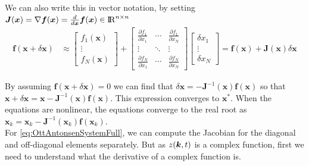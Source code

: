 We can also write this in vector notation, by setting $\boldsymbol{J}(\boldsymbol{x}) = \nabla \boldsymbol{f}(\boldsymbol{x}) = \frac{d}{d\boldsymbol{x}} \boldsymbol{f}(\boldsymbol{x}) \in {\rm I\!R}^{n \times n}$ 
\begin{align}
\boldsymbol{f}(\boldsymbol{x}+\delta \boldsymbol{x}) &\approx\left[\begin{array}{c}f_{1}(\boldsymbol{x}) \\ \vdots \\ f_{N}(\boldsymbol{x})\end{array}\right] 
+ \left[\begin{array}{ccc}\frac{\partial f_{1}}{\partial x_{1}} & \cdots & \frac{\partial f_{1}}{\partial x_{N}} \\ \vdots & \ddots & \vdots \\ \frac{\partial f_{N}}{\partial x_{1}} & \cdots & \frac{\partial f_{N}}{\partial x_{N}}\end{array}\right]
\left[\begin{array}{c}\delta x_{1} \\ \vdots \\ \delta x_{N}\end{array}\right] 
=\boldsymbol{f}(\boldsymbol{x})+\boldsymbol{J}(\boldsymbol{x}) \delta \boldsymbol{x} 
\end{align}

By assuming $\boldsymbol{f}(\boldsymbol{x}+\delta \boldsymbol{x}) = 0$ we can find that $\delta \boldsymbol{x} = -\boldsymbol{J}^{-1}( \boldsymbol{x}) \boldsymbol{f}(\boldsymbol{x})$ so that $\boldsymbol{x} + \delta \boldsymbol{x} =  \boldsymbol{x} - \boldsymbol{J}^{-1} (\boldsymbol{x}) \boldsymbol{f}(\boldsymbol{x})$. This expression converges to $\boldsymbol{x^\ast}$. When the equations are nonlinear, the equations converge to the real root as $\boldsymbol{x}_k =  \boldsymbol{x}_k - \boldsymbol{J}^{-1} ( \boldsymbol{x}_k)\boldsymbol{f}(\boldsymbol{x}_k)$. \\

For \eqref{eq:OttAntonsenSystemFull}, we can compute the Jacobian for the diagonal and off-diagonal elements separately. But as $z({\boldsymbol{k}},t)$ is a complex function, first we need to understand what the derivative of a complex function is. 


